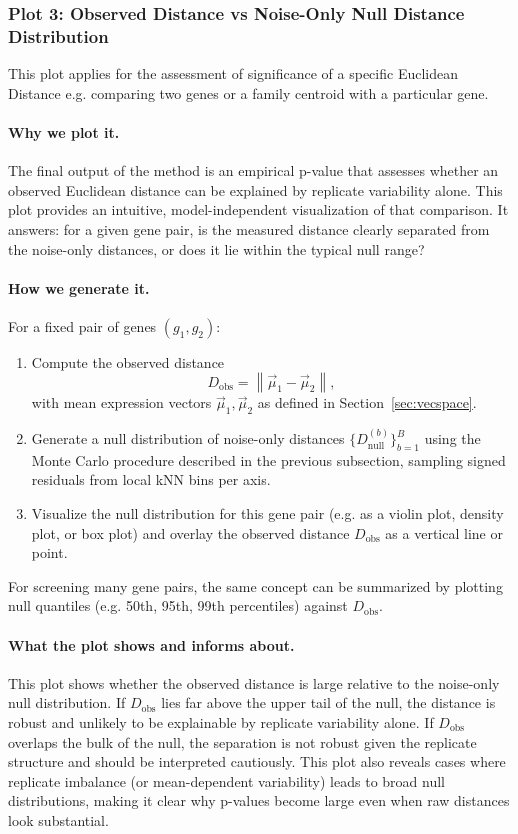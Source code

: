 \documentclass{article}
\begin{document}
\subsubsection{Plot 3: Observed Distance vs Noise-Only Null Distance Distribution}
\label{ssec:noise_vs_obs_distance_plot}

This plot applies for the assessment of significance of a specific Euclidean Distance e.g. comparing two genes or a family centroid with a particular gene.

\paragraph{Why we plot it.}
The final output of the method is an empirical p-value that assesses whether an observed Euclidean distance can be explained by replicate variability alone. This plot provides an intuitive, model-independent visualization of that comparison. It answers: for a given gene pair, is the measured distance clearly separated from the noise-only distances, or does it lie within the typical null range?

\paragraph{How we generate it.}
For a fixed pair of genes $(g_1, g_2)$:
\begin{enumerate}
\item Compute the observed distance
\[
D_{\mathrm{obs}} = \left\| \vec{\mu}_1 - \vec{\mu}_2 \right\|,
\]
with mean expression vectors $\vec{\mu}_1, \vec{\mu}_2$ as defined in Section~\ref{sec:vecspace}.
\item Generate a null distribution of noise-only distances $\{D_{\mathrm{null}}^{(b)}\}_{b=1}^B$ using the Monte Carlo procedure described in the previous subsection, sampling signed residuals from local kNN bins per axis.
\item Visualize the null distribution for this gene pair (e.g. as a violin plot, density plot, or box plot) and overlay the observed distance $D_{\mathrm{obs}}$ as a vertical line or point.
\end{enumerate}
For screening many gene pairs, the same concept can be summarized by plotting null quantiles (e.g. 50th, 95th, 99th percentiles) against $D_{\mathrm{obs}}$.

\paragraph{What the plot shows and informs about.}
This plot shows whether the observed distance is large relative to the noise-only null distribution. If $D_{\mathrm{obs}}$ lies far above the upper tail of the null, the distance is robust and unlikely to be explainable by replicate variability alone. If $D_{\mathrm{obs}}$ overlaps the bulk of the null, the separation is not robust given the replicate structure and should be interpreted cautiously. This plot also reveals cases where replicate imbalance (or mean-dependent variability) leads to broad null distributions, making it clear why p-values become large even when raw distances look substantial.
\end{document}
